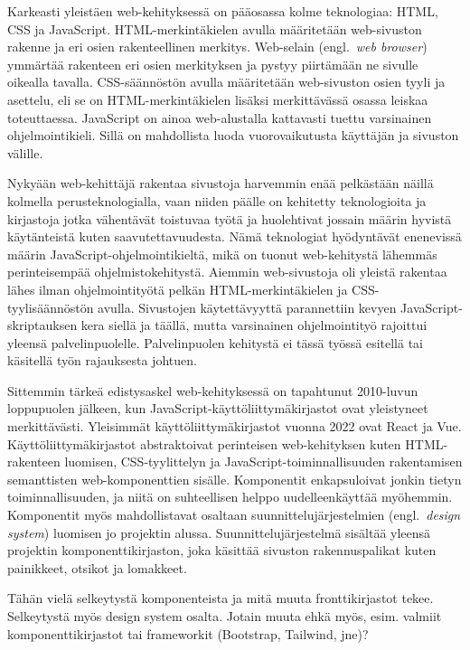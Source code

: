 \documentclass[finnish, 12pt, a4paper, elec, utf8, a-1b, online]{aaltothesis}
\begin{document}
Karkeasti yleistäen web-kehityksessä on pääosassa kolme teknologiaa: HTML, CSS
ja JavaScript. HTML-merkintäkielen avulla määritetään web-sivuston rakenne ja
eri osien rakenteellinen merkitys. Web-selain (engl.\ \textit{web browser})
ymmärtää rakenteen eri osien merkityksen ja pystyy piirtämään ne sivulle
oikealla tavalla. CSS-säännöstön avulla määritetään web-sivuston osien tyyli ja
asettelu, eli se on HTML-merkintäkielen lisäksi merkittävässä osassa leiskaa
toteuttaessa. JavaScript on ainoa web-alustalla kattavasti tuettu varsinainen
ohjelmointikieli. Sillä on mahdollista luoda vuorovaikutusta käyttäjän ja
sivuston välille.

Nykyään web-kehittäjä rakentaa sivustoja harvemmin enää pelkästään näillä
kolmella perusteknologialla, vaan niiden päälle on kehitetty teknologioita ja
kirjastoja jotka vähentävät toistuvaa työtä ja huolehtivat jossain määrin
hyvistä käytänteistä kuten saavutettavuudesta. Nämä teknologiat hyödyntävät
enenevissä määrin JavaScript-ohjelmointikieltä, mikä on tuonut web-kehitystä
lähemmäs perinteisempää ohjelmistokehitystä. Aiemmin web-sivustoja oli yleistä
rakentaa lähes ilman ohjelmointityötä pelkän HTML-merkintäkielen ja
CSS-tyylisäännöstön avulla. Sivustojen käytettävyyttä parannettiin kevyen
JavaScript-skriptauksen kera siellä ja täällä, mutta varsinainen ohjelmointityö
rajoittui yleensä palvelinpuolelle. Palvelinpuolen kehitystä ei tässä työssä
esitellä tai käsitellä työn rajauksesta johtuen.

Sittemmin tärkeä edistysaskel web-kehityksessä on tapahtunut 2010-luvun
loppupuolen jälkeen, kun JavaScript-käyttöliittymäkirjastot ovat yleistyneet
merkittävästi. Yleisimmät käyttöliittymäkirjastot vuonna 2022 ovat React ja Vue.
Käyttöliittymäkirjastot abstraktoivat perinteisen web-kehityksen kuten
HTML-rakenteen luomisen, CSS-tyylittelyn ja JavaScript-toiminnallisuuden
rakentamisen semanttisten web-komponenttien sisälle. Komponentit enkapsuloivat
jonkin tietyn toiminnallisuuden, ja niitä on suhteellisen helppo
uudelleenkäyttää myöhemmin. Komponentit myös mahdollistavat osaltaan
suunnittelujärjestelmien (engl.\ \textit{design system}) luomisen jo projektin
alussa. Suunnittelujärjestelmä sisältää yleensä projektin komponenttikirjaston,
joka käsittää sivuston rakennuspalikat kuten painikkeet, otsikot ja lomakkeet.

Tähän vielä selkeytystä komponenteista ja mitä muuta fronttikirjastot tekee.
Selkeytystä myös design system osalta. Jotain muuta ehkä myös, esim. valmiit
komponenttikirjastot tai frameworkit (Bootstrap, Tailwind, jne)?
\end{document}
